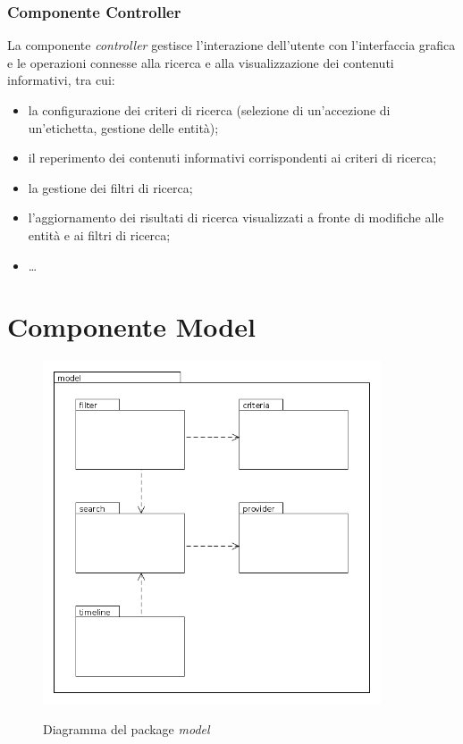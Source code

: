 \documentclass[10pt,a4paper,headinclude,footinclude,hidelinks]{scrreprt} %
\begin{document}
	\subsection{Componente Controller}
	\label{sec:stage:design:mvc:controller}
	La componente \textit{controller} gestisce l'interazione dell'utente con l'interfaccia grafica e le operazioni connesse alla ricerca e alla visualizzazione dei contenuti informativi, tra cui:
	\begin{itemize}
	\item la configurazione dei criteri di ricerca (selezione di un'accezione di un'etichetta, gestione delle entità);
	\item il reperimento dei contenuti informativi corrispondenti ai criteri di ricerca;
	\item la gestione dei filtri di ricerca;
	\item l'aggiornamento dei risultati di ricerca visualizzati a fronte di modifiche alle entità e ai filtri di ricerca;
	\item \ldots
	\end{itemize}

	\chapter{Componente Model}
	\label{ch:stage:design:model}

	\begin{figure}[ht]
		\begin{center}
	    	\includegraphics[width=10cm]{package/model.png}
			\label{gfx:package:model}
			\caption{Diagramma del package \textit{model}}
		\end{center}
	\end{figure}
\end{document}
